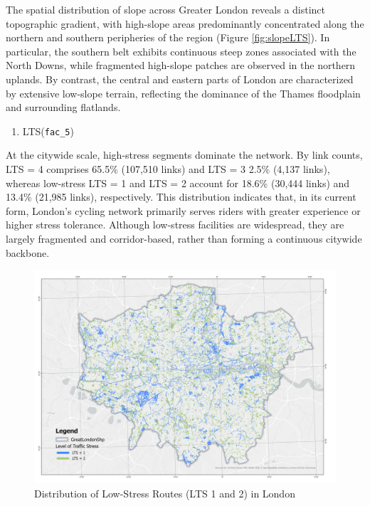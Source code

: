 \documentclass[
  12pt,
  oneside]{book}
\providecommand{\tightlist}{%
  \setlength{\itemsep}{0pt}\setlength{\parskip}{0pt}}
\begin{document}
The spatial distribution of slope across Greater London reveals a distinct topographic gradient, with high-slope areas predominantly concentrated along the northern and southern peripheries of the region (Figure \ref{fig:slopeLTS}). In particular, the southern belt exhibits continuous steep zones associated with the North Downs, while fragmented high-slope patches are observed in the northern uplands. By contrast, the central and eastern parts of London are characterized by extensive low-slope terrain, reflecting the dominance of the Thames floodplain and surrounding flatlands.

\begin{enumerate}
\def\labelenumi{\arabic{enumi}.}
\setcounter{enumi}{1}
\tightlist
\item
  LTS(\texttt{fac\_5})
\end{enumerate}

At the citywide scale, high-stress segments dominate the network. By link counts, LTS = 4 comprises 65.5\% (107,510 links) and LTS = 3 2.5\% (4,137 links), whereas low-stress LTS = 1 and LTS = 2 account for 18.6\% (30,444 links) and 13.4\% (21,985 links), respectively. This distribution indicates that, in its current form, London's cycling network primarily serves riders with greater experience or higher stress tolerance. Although low-stress facilities are widespread, they are largely fragmented and corridor-based, rather than forming a continuous citywide backbone.

\begin{figure}

{\centering \includegraphics[width=1\linewidth]{general_images/LTS12} 

}

\caption{Distribution of Low-Stress Routes (LTS 1 and 2) in London}\label{fig:LTS12}
\end{figure}
\end{document}
